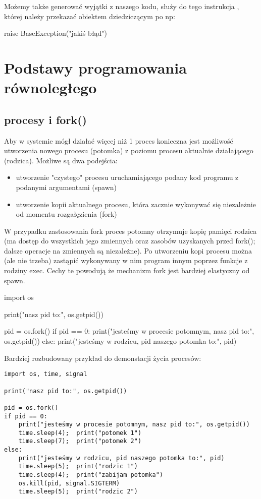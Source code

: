 \documentclass{pdfBooklets}
\begin{document}
Możemy także generować wyjątki z naszego kodu, służy do tego instrukcja , której należy przekazać obiektem dziedziczącym po  np:

\begin{CodeFrame*}[python]{}
raise BaseException("jakiś błąd")
\end{CodeFrame*}

\section{Podstawy programowania równoległego}

\subsection{procesy i fork()}

Aby w systemie mógł działać więcej niż 1 proces konieczna jest możliwość utworzenia nowego procesu (potomka) z poziomu procesu aktualnie działającego (rodzica). Możliwe są dwa podejścia:
\begin{itemize}
	\item utworzenie "czystego" procesu uruchamiającego podany kod programu z podanymi argumentami (spawn)
	\item utworzenie kopii aktualnego procesu, która zacznie wykonywać się niezależnie od momentu rozgałęzienia (fork)
\end{itemize}
W przypadku zastosowania fork proces potomny otrzymuje kopię pamięci rodzica (ma dostęp do wszystkich jego zmiennych oraz zasobów uzyskanych przed fork(); dalsze operacje na zmiennych są niezależne). Po utworzeniu kopi procesu można (ale nie trzeba) zastąpić wykonywany w nim program innym poprzez funkcje z rodziny exec. Cechy te powodują że mechanizm fork jest bardziej elastyczny od spawn.

\begin{CodeFrame*}[python]{}
import os

print("nasz pid to:", os.getpid())

pid = os.fork()
if pid == 0:
	print("jesteśmy w procesie potomnym, nasz pid to:", os.getpid())
else:
	print("jesteśmy w rodzicu, pid naszego potomka to:", pid)
\end{CodeFrame*}

\begin{teacherOnly}
Bardziej rozbudowany przykład do demonstacji życia procesów:
\begin{Verbatim}
import os, time, signal

print("nasz pid to:", os.getpid())

pid = os.fork()
if pid == 0:
	print("jesteśmy w procesie potomnym, nasz pid to:", os.getpid())
	time.sleep(4);  print("potomek 1")
	time.sleep(7);  print("potomek 2")
else:
	print("jesteśmy w rodzicu, pid naszego potomka to:", pid)
	time.sleep(5);  print("rodzic 1")
	time.sleep(4);  print("zabijam potomka")
	os.kill(pid, signal.SIGTERM)
	time.sleep(5);  print("rodzic 2")
\end{Verbatim}
\end{teacherOnly}
\end{document}
